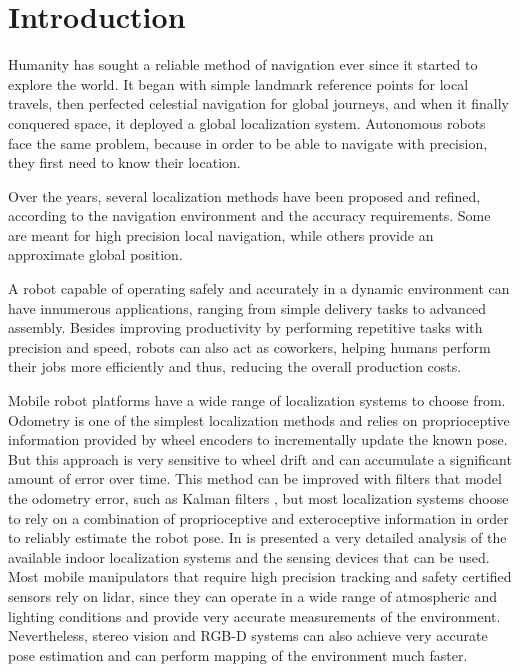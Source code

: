 \section{Introduction}\label{sec:introduction}

Humanity has sought a reliable method of navigation ever since it started to explore the world. It began with simple landmark reference points for local travels, then perfected celestial navigation for global journeys, and when it finally conquered space, it deployed a global localization system. Autonomous robots face the same problem, because in order to be able to navigate with precision, they first need to know their location.

Over the years, several localization methods have been proposed and refined, according to the navigation environment and the accuracy requirements. Some are meant for high precision local navigation, while others provide an approximate global position.

A robot capable of operating safely and accurately in a dynamic environment can have innumerous applications, ranging from simple delivery tasks to advanced assembly. Besides improving productivity by performing repetitive tasks with precision and speed, robots can also act as coworkers, helping humans perform their jobs more efficiently and thus, reducing the overall production costs.

Mobile robot platforms have a wide range of localization systems to choose from. Odometry is one of the simplest localization methods and relies on proprioceptive information provided by wheel encoders to incrementally update the known pose. But this approach is very sensitive to wheel drift and can accumulate a significant amount of error over time. This method can be improved with filters that model the odometry error, such as Kalman filters \cite{Wan2002}, but most localization systems choose to rely on a combination of proprioceptive and exteroceptive information in order to reliably estimate the robot pose. In \cite{Mautz2012} is presented a very detailed analysis of the available indoor localization systems and the sensing devices that can be used. Most mobile manipulators that require high precision tracking and safety certified sensors rely on \gls{lidar}, since they can operate in a wide range of atmospheric and lighting conditions and provide very accurate measurements of the environment. Nevertheless, stereo vision and RGB-D systems can also achieve very accurate pose estimation and can perform mapping of the environment much faster.

